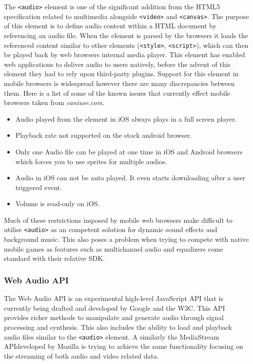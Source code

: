 \documentclass[final]{cmpreport}
\begin{document}
The \texttt{<audio>} element is one of the significant addition from the HTML5 specification related to multimedia alongside \texttt{<video>} and \texttt{<canvas>}. The purpose of this element is to define audio content within a HTML document by referencing an audio file. When the element is parsed by the browsers it loads the referenced content similar to other elements (\texttt{<style>}, \texttt{<script>}), which can then be played back by web browsers internal media player. This element has enabled web applications to deliver audio to users natively, before the advent of this element they had to rely upon third-party plugins. Support for this element in mobile browsers is widespread however there are many discrepancies between them. Here is a list of some of the known issues that currently effect mobile browsers taken from \textit{caniuse.com\footnotemark}.


\begin{itemize}
  \item Audio played from the element in iOS always plays in a full screen player.
  \item Playback rate not supported on the stock android browser.
  \item Only one Audio file can be played at one time in iOS and Android browsers which forces you to use sprites for multiple audios.
  \item Audio in iOS can not be auto played. It even starts downloading after a user triggered event.
  \item Volume is read-only on iOS.
\end{itemize}

Much of these restrictions imposed by mobile web browsers make difficult to utilise \texttt{<audio>} as an competent solution for dynamic sound effects and background music. This also poses a problem when trying to compete with native mobile games as features such as multichannel audio and equalizers come standard with their relative SDK.

\subsubsection{Web Audio API}
The Web Audio API is an experimental high-level JavaScript API that is currently being drafted and developed by Google and the W3C\footnotemark. This API provides richer methods to manipulate and generate audio through signal processing and synthesis. This also includes the ability to load and playback audio files similar to the \texttt{<audio>} element. A similarly the MediaStream API\footnotemark developed by Mozilla is trying to achieve the same functionality focusing on the streaming of both audio and video related data.
\end{document}
